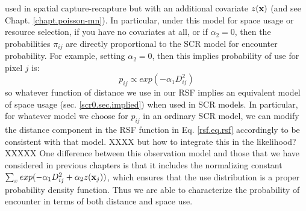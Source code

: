 used in spatial capture-recapture but with an additional covariate
$z({\bf x})$ (and see Chapt. \ref{chapt.poisson-mn}).
In particular, under this model for space usage or resource selection,
if you have no covariates at all, or if $\alpha_{2} =
0$, then
the probabilities $\pi_{ij}$ are directly proportional to the SCR
model for encounter probability.
For example, setting $\alpha_{2} = 0$, then this implies probability
of use for pixel $j$ is:
\[
p_{ij} \propto  exp( -\alpha_{1} D_{ij}^{2})
\]
so whatever function of distance we use in our RSF implies an
equivalent model of space usage (sec. \ref{scr0.sec.implied})
when used in SCR models. In particular, for whatever model we choose
for $p_{ij}$ in an ordinary SCR model, we can modify the distance
component in the RSF function
in Eq. \ref{rsf.eq.rsf} accordingly to be consistent with that model.
XXXX but how to integrate this in the likelihood? XXXXX
One difference between this observation model
and those that we have considered in previous chapters is that it
includes the 
normalizing constant $\sum_{x} exp(-\alpha_{1} D_{ij}^{2} +\alpha_{2}
z({\bf x}_{j}))$, which ensures that the use distribution is a 
proper probability density function. Thus we are able to characterize 
the probability of encounter in terms of both distance and space use.

